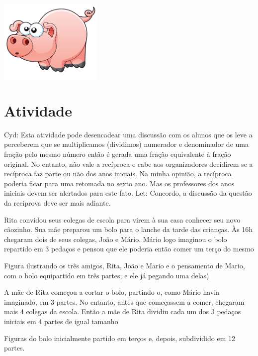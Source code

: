 \documentclass[a4,12pt]{book}
\newcounter{atividade}
\begin{document}
\includegraphics[width=\textwidth,height=4cm, keepaspectratio]{pig}
\section{Atividade}









Cyd: Esta atividade pode desencadear uma discussão com os alunos que os leve a perceberem que se multiplicamos (dividimos) numerador e denominador de uma fração pelo mesmo número então é gerada uma fração equivalente à fração original. No entanto, não vale a recíproca e cabe aos organizadores decidirem se a recíproca faz parte ou não dos anos iniciais. Na minha opinião, a recíproca poderia ficar para uma retomada no sexto ano. Mas os professores dos anos iniciais devem ser alertados para este fato.
Let: Concordo, a discussão da questão da recíprova deve ser mais adiante.


Rita convidou seus colegas de escola para virem à sua casa conhecer seu novo cãozinho. Sua mãe preparou um bolo para o lanche da tarde das crianças. Às 16h chegaram dois de seus colegas, João e Mário. Mário logo imaginou o bolo repartido em 3 pedaços e pensou que ele poderia então comer um terço do mesmo

\begin{imagem*}[breakable]{}{}
  Figura ilustrando os três amigos, Rita, João e Mario e o pensamento de Mario, com o bolo equipartido em três partes, e ele já pegando uma delas)
\end{imagem*}

A mãe de Rita começou a cortar o bolo, partindo-o, como Mário havia imaginado, em 3 partes. No entanto, antes que começassem a comer, chegaram mais 4 colegas da escola. Então a mãe de Rita dividiu cada um dos 3 pedaços iniciais em 4 partes de igual tamanho

\begin{imagem*}[breakable]{}{}
  Figuras do bolo inicialmente partido em terços e, depois, subdividido em 12 partes.
\end{imagem*}
\end{document}
